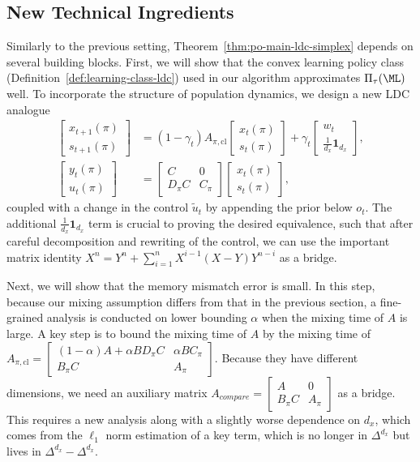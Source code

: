 \subsection{New Technical Ingredients} Similarly to the previous setting, Theorem~\ref{thm:po-main-ldc-simplex} depends on several building blocks. 
First, we will show that the convex learning policy class (Definition~\ref{def:learning-class-ldc}) used in our algorithm approximates $\Pi_{\tau}(\ML)$ well. To incorporate the structure of population dynamics, we design a new LDC analogue
\begin{align*}
\begin{bmatrix}
x_{t+1}(\pi) \\
s_{t+1}(\pi)
\end{bmatrix}
&=(1-\gamma_t)A_{\pi,\mathrm{cl}}\begin{bmatrix}
x_t(\pi)\\
s_t(\pi)
\end{bmatrix}+\gamma_t \begin{bmatrix}
w_t\\
\frac{1}{d_x}\mathbf{1}_{d_x}
\end{bmatrix}, \\
\begin{bmatrix}
y_{t}(\pi) \\
u_{t}(\pi)
\end{bmatrix}
&=\begin{bmatrix}
C & 0\\
D_{\pi}C & C_{\pi}
\end{bmatrix}\begin{bmatrix}
x_t(\pi)\\
s_t(\pi)
\end{bmatrix},
\end{align*}
coupled with a change in the control $\tilde{u}_t$ by appending the prior below $o_t$. The additional $\frac{1}{d_x}\mathbf{1}_{d_x}$ term is crucial to proving the desired equivalence, such that after careful decomposition and rewriting of the control, we can use the important matrix identity $X^n=Y^n+\sum_{i=1}^n X^{i-1}(X-Y)Y^{n-i}$ as a bridge.

Next, we will show that the memory mismatch error is small. In this step, because our mixing assumption differs from that in the previous section, a fine-grained analysis is conducted on lower bounding $\alpha$ when the mixing time of $A$ is large. A key step is to bound the mixing time of $A$ by the mixing time of $A_{\pi,\mathrm{cl}}=\begin{bmatrix}
(1-\alpha)A+\alpha BD_{\pi}C & \alpha BC_{\pi} \\
 B_{\pi}C & A_{\pi}
\end{bmatrix}.$ Because they have different dimensions, we need an auxiliary matrix $A_{compare}=\begin{bmatrix}
A & 0 \\
 B_{\pi}C & A_{\pi}
\end{bmatrix}$ as a bridge. This requires a new analysis along with a slightly worse dependence on $d_x$, which comes from the $\ell_1$ norm estimation of a key term, which is no longer in $\Delta^{d_x}$ but lives in $\Delta^{d_x}-\Delta^{d_x}$.
